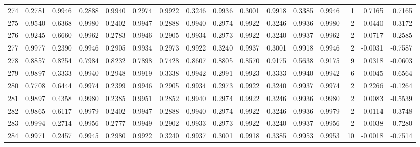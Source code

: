 \begin{tabular}{lrrrrrrrrrrrrrrr}
274 &      0.2781 &  0.9946 &  0.2888 &  0.9940 &  0.2974 &  0.9922 &  0.3246 &  0.9936 &  0.3001 &  0.9918 &   0.3385 &     0.9946 &      1 &                    0.7165 &                     0.7165 \\
275 &      0.9540 &  0.6368 &  0.9980 &  0.2402 &  0.9947 &  0.2888 &  0.9940 &  0.2974 &  0.9922 &  0.3246 &   0.9936 &     0.9980 &      2 &                    0.0440 &                    -0.3172 \\
276 &      0.9245 &  0.6660 &  0.9962 &  0.2783 &  0.9946 &  0.2905 &  0.9934 &  0.2973 &  0.9922 &  0.3240 &   0.9937 &     0.9962 &      2 &                    0.0717 &                    -0.2585 \\
277 &      0.9977 &  0.2390 &  0.9946 &  0.2905 &  0.9934 &  0.2973 &  0.9922 &  0.3240 &  0.9937 &  0.3001 &   0.9918 &     0.9946 &      2 &                   -0.0031 &                    -0.7587 \\
278 &      0.8857 &  0.8254 &  0.7984 &  0.8232 &  0.7898 &  0.7428 &  0.8607 &  0.8805 &  0.8570 &  0.9175 &   0.5638 &     0.9175 &      9 &                    0.0318 &                    -0.0603 \\
279 &      0.9897 &  0.3333 &  0.9940 &  0.2948 &  0.9919 &  0.3338 &  0.9942 &  0.2991 &  0.9923 &  0.3333 &   0.9940 &     0.9942 &      6 &                    0.0045 &                    -0.6564 \\
280 &      0.7708 &  0.6444 &  0.9974 &  0.2399 &  0.9946 &  0.2905 &  0.9934 &  0.2973 &  0.9922 &  0.3240 &   0.9937 &     0.9974 &      2 &                    0.2266 &                    -0.1264 \\
281 &      0.9897 &  0.4358 &  0.9980 &  0.2385 &  0.9951 &  0.2852 &  0.9940 &  0.2974 &  0.9922 &  0.3246 &   0.9936 &     0.9980 &      2 &                    0.0083 &                    -0.5539 \\
282 &      0.9865 &  0.6117 &  0.9979 &  0.2402 &  0.9947 &  0.2888 &  0.9940 &  0.2974 &  0.9922 &  0.3246 &   0.9936 &     0.9979 &      2 &                    0.0114 &                    -0.3748 \\
283 &      0.9994 &  0.2714 &  0.9956 &  0.2777 &  0.9949 &  0.2902 &  0.9933 &  0.2973 &  0.9922 &  0.3240 &   0.9937 &     0.9956 &      2 &                   -0.0038 &                    -0.7280 \\
284 &      0.9971 &  0.2457 &  0.9945 &  0.2980 &  0.9922 &  0.3240 &  0.9937 &  0.3001 &  0.9918 &  0.3385 &   0.9953 &     0.9953 &     10 &                   -0.0018 &                    -0.7514 \\

\end{tabular}
